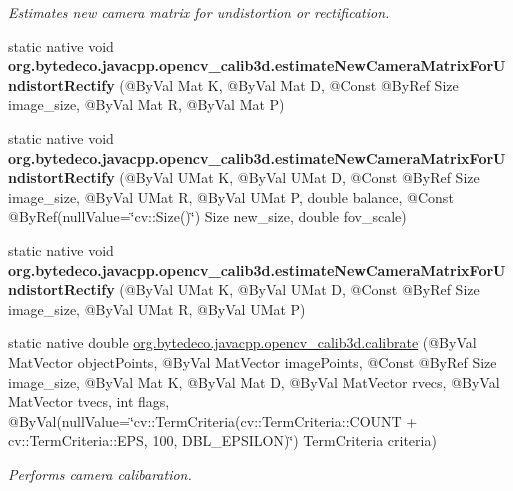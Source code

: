\begin{DoxyCompactItemize}
\begin{DoxyCompactList}\small\item\em Estimates new camera matrix for undistortion or rectification. \end{DoxyCompactList}\item 
\mbox{\label{group__calib3d__fisheye_gae32562832d18326d919dbe2cc1586925}} 
static native void {\bfseries org.\+bytedeco.\+javacpp.\+opencv\+\_\+calib3d.\+estimate\+New\+Camera\+Matrix\+For\+Undistort\+Rectify} (@By\+Val Mat K, @By\+Val Mat D, @Const @By\+Ref Size image\+\_\+size, @By\+Val Mat R, @By\+Val Mat P)
\item 
\mbox{\label{group__calib3d__fisheye_ga129b1150235c50d5af49afd3f4a872bc}} 
static native void {\bfseries org.\+bytedeco.\+javacpp.\+opencv\+\_\+calib3d.\+estimate\+New\+Camera\+Matrix\+For\+Undistort\+Rectify} (@By\+Val U\+Mat K, @By\+Val U\+Mat D, @Const @By\+Ref Size image\+\_\+size, @By\+Val U\+Mat R, @By\+Val U\+Mat P, double balance, @Const @By\+Ref(null\+Value=\char`\"{}cv\+::\+Size()\char`\"{}) Size new\+\_\+size, double fov\+\_\+scale)
\item 
\mbox{\label{group__calib3d__fisheye_ga76470923a35ad53154db056fd3fcfbb8}} 
static native void {\bfseries org.\+bytedeco.\+javacpp.\+opencv\+\_\+calib3d.\+estimate\+New\+Camera\+Matrix\+For\+Undistort\+Rectify} (@By\+Val U\+Mat K, @By\+Val U\+Mat D, @Const @By\+Ref Size image\+\_\+size, @By\+Val U\+Mat R, @By\+Val U\+Mat P)
\item 
static native double \hyperlink{group__calib3d__fisheye_ga4fd78a3672b06b47ba34e82e17824e9d}{org.\+bytedeco.\+javacpp.\+opencv\+\_\+calib3d.\+calibrate} (@By\+Val Mat\+Vector object\+Points, @By\+Val Mat\+Vector image\+Points, @Const @By\+Ref Size image\+\_\+size, @By\+Val Mat K, @By\+Val Mat D, @By\+Val Mat\+Vector rvecs, @By\+Val Mat\+Vector tvecs, int flags, @By\+Val(null\+Value=\char`\"{}cv\+::\+Term\+Criteria(cv\+::\+Term\+Criteria\+::\+C\+O\+U\+NT + cv\+::\+Term\+Criteria\+::\+E\+PS, 100, D\+B\+L\+\_\+\+E\+P\+S\+I\+L\+ON)\char`\"{}) Term\+Criteria criteria)
\begin{DoxyCompactList}\small\item\em Performs camera calibaration. \end{DoxyCompactList}\item 
\mbox{\label{group__calib3d__fisheye_ga6dd24ad92cc98650a657ff6875e456df}} 

\end{DoxyCompactItemize}
